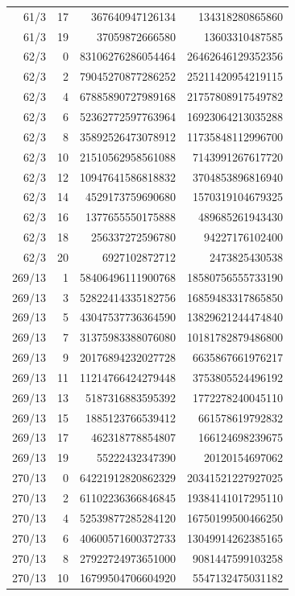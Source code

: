 \begin{longtable}{@{}rrrr@{}}
61/3 & 17 & 367640947126134 & 134318280865860\\
61/3 & 19 & 37059872666580 & 13603310487585\\
62/3 & 0 & 83106276286054464 & 26462646129352356\\
62/3 & 2 & 79045270877286252 & 25211420954219115\\
62/3 & 4 & 67885890727989168 & 21757808917549782\\
62/3 & 6 & 52362772597763964 & 16923064213035288\\
62/3 & 8 & 35892526473078912 & 11735848112996700\\
62/3 & 10 & 21510562958561088 & 7143991267617720\\
62/3 & 12 & 10947641586818832 & 3704853896816940\\
62/3 & 14 & 4529173759690680 & 1570319104679325\\
62/3 & 16 & 1377655550175888 & 489685261943430\\
62/3 & 18 & 256337272596780 & 94227176102400\\
62/3 & 20 & 6927102872712 & 2473825430538\\
269/13 & 1 & 58406496111900768 & 18580756555733190\\
269/13 & 3 & 52822414335182756 & 16859483317865850\\
269/13 & 5 & 43047537736364590 & 13829621244474840\\
269/13 & 7 & 31375983388076080 & 10181782879486800\\
269/13 & 9 & 20176894232027728 & 6635867661976217\\
269/13 & 11 & 11214766424279448 & 3753805524496192\\
269/13 & 13 & 5187316883595392 & 1772278240045110\\
269/13 & 15 & 1885123766539412 & 661578619792832\\
269/13 & 17 & 462318778854807 & 166124698239675\\
269/13 & 19 & 55222432347390 & 20120154697062\\
270/13 & 0 & 64221912820862329 & 20341521227927025\\
270/13 & 2 & 61102236366846845 & 19384141017295110\\
270/13 & 4 & 52539877285284120 & 16750199500466250\\
270/13 & 6 & 40600571600372733 & 13049914262385165\\
270/13 & 8 & 27922724973651000 & 9081447599103258\\
270/13 & 10 & 16799504706604920 & 5547132475031182\\

\end{longtable}
